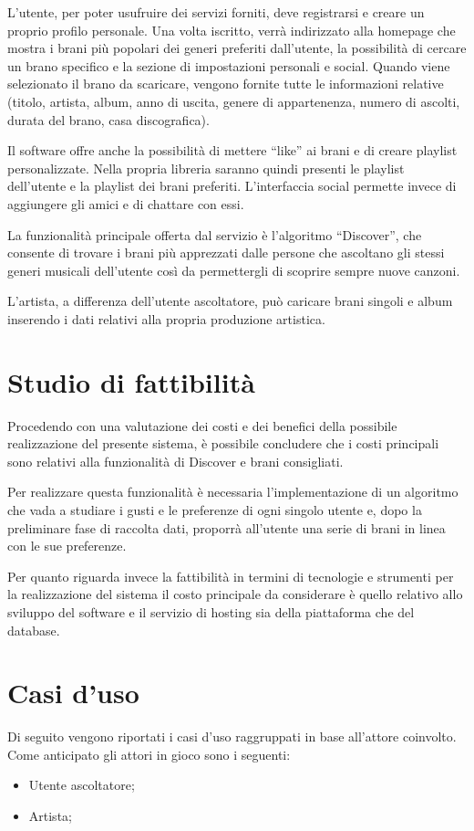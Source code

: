 L'utente, per poter usufruire dei servizi forniti, deve registrarsi e creare un proprio
profilo personale. Una volta iscritto, verrà indirizzato alla homepage che mostra i brani
più popolari dei generi preferiti dall'utente, la possibilità di cercare un brano
specifico e la sezione di impostazioni personali e social. Quando viene selezionato il
brano da scaricare, vengono fornite tutte le informazioni relative (titolo, artista,
album, anno di uscita, genere di appartenenza, numero di ascolti, durata del brano, casa
discografica).

Il software offre anche la possibilità di mettere ``like'' ai brani e di creare playlist
personalizzate. Nella propria libreria saranno quindi presenti le playlist dell'utente e
la playlist dei brani preferiti. L'interfaccia social permette invece di aggiungere gli
amici e di chattare con essi.

La funzionalità principale offerta dal servizio è l'algoritmo ``Discover'', che consente
di trovare i brani più apprezzati dalle persone che ascoltano gli stessi generi musicali
dell'utente così da permettergli di scoprire sempre nuove canzoni.

L'artista, a differenza dell'utente ascoltatore, può caricare brani singoli e album
inserendo i dati relativi alla propria produzione artistica.


\vspace{1cm}
\section{Studio di fattibilità}
Procedendo con una valutazione dei costi e dei benefici della possibile realizzazione del
presente sistema, è possibile concludere che i costi principali sono relativi alla
funzionalità di Discover e brani consigliati. 

Per realizzare questa funzionalità è
necessaria l'implementazione di un algoritmo che vada a studiare i gusti e le preferenze
di ogni singolo utente e, dopo la preliminare fase di raccolta dati, proporrà all'utente
una serie di brani in linea con le sue preferenze. 

Per quanto riguarda invece la
fattibilità in termini di tecnologie e strumenti per la realizzazione del sistema 
il costo principale da considerare è quello relativo allo sviluppo del software e il servizio di hosting sia 
della piattaforma che del database. 


\newpage
\section{Casi d'uso}
Di seguito vengono riportati i casi d'uso raggruppati in base all'attore coinvolto. Come
anticipato gli attori in gioco sono i seguenti:
\begin{itemize}
      \item Utente ascoltatore;
      \item Artista;
\end{itemize}


